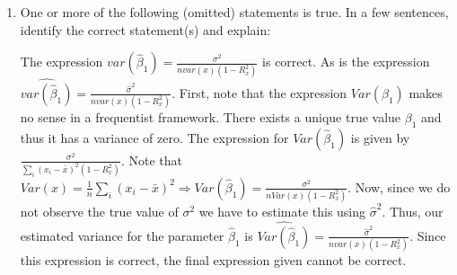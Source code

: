 \documentclass[12pt]{article}
\begin{document}
    \begin{enumerate}
    \item One or more of the following (omitted) statements is true.  In a few sentences, identify the correct statement(s) and explain:

\vspace{4mm} 

    The expression $var(\hat{\beta}_1) = \frac{\sigma^2}{n var(x)(1-R^2_x)}$ is correct.  As is the expression $\widehat{var(\hat{\beta}_1)} = \frac{\hat{\sigma}^2}{n var(x)(1-R^2_x)}$.  First, note that the expression $Var(\beta_1)$ makes no sense in a frequentist framework.  There exists a unique true value $\beta_1$ and thus it has a variance of zero.  The expression for $Var(\hat{\beta}_1)$ is given by $\frac{\sigma^2}{\sum_i (x_i-\bar{x})^2 (1-R^2_x)}$.  Note that $Var(x) = \frac{1}{n} \sum_i (x_i - \bar{x})^2 \Rightarrow Var(\hat{\beta}_1) = \frac{\sigma^2}{n Var(x) (1-R^2_x)}$.  Now, since we do not observe the true value of $\sigma^2$ we have to estimate this using $\hat{\sigma}^2$.  Thus, our estimated variance for the parameter $\hat{\beta}_1$ is $\widehat{Var(\hat{\beta}_1)} = \frac{\hat{\sigma}^2}{n var(x)(1-R^2_x)}$.  Since this expression is correct, the final expression given cannot be correct.
%


\end{enumerate}
\end{document}
